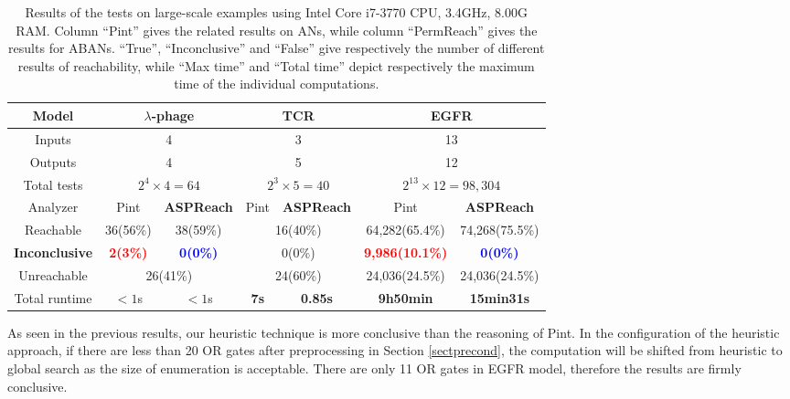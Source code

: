 \documentclass[runningheads]{llncs}
\begin{document}
\begin{table}[ht]
\centering
    \begin{tabular}{|c|c|c|c|c|c|c|}
    \hline
  	Model	&\multicolumn{2}{c|}{$\lambda$-phage}	&	  \multicolumn{2}{c|}{TCR} & \multicolumn{2}{c|}{EGFR}  \\
    \hline
    Inputs&\multicolumn{2}{c|}{4}	&	  \multicolumn{2}{c|}{3} & \multicolumn{2}{c|}{13}\\
    \hline
    Outputs&\multicolumn{2}{c|}{4} &	  \multicolumn{2}{c|}{5} & \multicolumn{2}{c|}{12} \\
    \hline
    Total tests&\multicolumn{2}{c|}{$2^4\times 4=64$} & \multicolumn{2}{c|}{$2^3\times 5=40$} & \multicolumn{2}{c|}{$2^{13}\times 12=98,304$}\\
    \hline
    Analyzer  &  Pint       &\textbf{ASPReach}    &  Pint       &\textbf{ASPReach}   &  Pint       &\textbf{ASPReach}             \\
    \hline
    Reachable    & 36(56\%)& 38(59\%)   &  \multicolumn{2}{c|}{16(40\%)}  & 64,282(65.4\%)&74,268(75.5\%)\\
    \hline
    \textbf{Inconclusive} & \textcolor{red}{\textbf{2(3\%)}}&\textcolor{blue}{\textbf{0(0\%)}}& \multicolumn{2}{c|}{0(0\%)}    &\textcolor{red}{\textbf{9,986(10.1\%)}}&\textcolor{blue}{\textbf{0(0\%)}}  \\
    \hline
    Unreachable     &  \multicolumn{2}{c|}{26(41\%)} &  \multicolumn{2}{c|}{24(60\%)} &24,036(24.5\%)&24,036(24.5\%)\\
    \hline
    Total runtime &  $<1$s       &  $<1$s &  \textbf{7s}       &  \textbf{0.85s}        & \textbf{9h50min}              & \textbf{15min31s}      \\
    \hline
    \end{tabular}
\caption{Results of the tests on large-scale examples using Intel Core i7-3770 CPU, \@3.4GHz, 8.00G RAM. 
Column “Pint” gives the related results on ANs, while column “PermReach” gives the results for ABANs. 
“True”, “Inconclusive” and “False” give respectively the number of different results of reachability, while “Max time” and “Total time” depict respectively the maximum time of the individual computations.}
\label{tab:2}
\end{table}

As seen in the previous results, our heuristic technique is more conclusive than the reasoning of Pint. 
In the configuration of the heuristic approach, if there are less than 20 OR gates after preprocessing in Section \ref{sectprecond}, the computation will be shifted from heuristic to global search as the size of enumeration is acceptable.
There are only 11 OR gates in EGFR model, therefore the results are firmly conclusive. 
\end{document}
